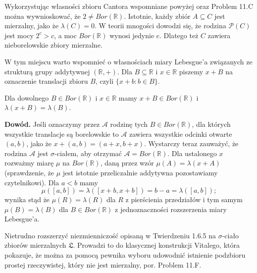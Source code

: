 Wykorzystując własności zbioru Cantora wspomniane powyżej oraz Problem 11.C można wywnioskować, że \(2 \neq Bor(\mathbb{R})\). Istotnie, każdy zbiór \(A \subseteq C\) jest mierzalny, jako że \(\lambda(C) = 0\). W teorii mnogości dowodzi się, że rodzina \(\mathcal{P}(C)\) jest mocy \(2^c > c\), a moc \(Bor(\mathbb{R})\) wynosi jedynie c. Dlatego też \(C\) zawiera nieborelowskie zbiory mierzalne.

W tym miejscu warto wspomnieć o własnościach miary Lebesgue’a związanych ze strukturą grupy addytywnej \((\mathbb{R}, +)\). Dla \(B \subseteq \mathbb{R} \) i \(x \in \mathbb{R}\) piszemy \(x + B\) na oznaczenie translacji zbioru \(B\), czyli \(\{x + b : b \in B\}\).

\begin{theorem}[1.6.5]
Dla dowolnego \(B \in Bor(\mathbb{R}) \) i \(x \in \mathbb{R}\) mamy \(x + B \in Bor(\mathbb{R}) \) i \(\lambda(x + B) = \lambda(B)\).
\end{theorem}

\textbf{Dowód.} Jeśli oznaczymy przez \(\mathcal{A}\) rodzinę tych \(B \in Bor(\mathbb{R})\), dla których wszystkie translacje są borelowskie to \(\mathcal{A}\) zawiera wszystkie odcinki otwarte \((a, b)\), jako że \(x + (a, b) = (a + x, b + x)\). Wystarczy teraz zauważyć, że rodzina \(\mathcal{A}\) jest \(\sigma\)-ciałem, aby otrzymać \(\mathcal{A} = Bor(\mathbb{R})\). Dla ustalonego \(x\) rozważmy miarę \(\mu\) na \(Bor(\mathbb{R})\), daną przez wzór \(\mu(A) = \lambda(x + A)\) (sprawdzenie, że \(\mu\) jest istotnie przeliczalnie addytywna pozostawiamy czytelnikowi). Dla \(a < b\) mamy
\[
\mu([a, b]) = \lambda([x + b, x + b]) = b - a = \lambda([a, b]);
\]
wynika stąd że \(\mu(R) = \lambda(R)\) dla \(R\) z pierścienia przedziałów i tym samym \(\mu(B) = \lambda(B)\) dla \(B \in Bor(\mathbb{R})\) z jednoznaczności rozszerzenia miary Lebesgue’a.

Nietrudno rozszerzyć niezmienniczość opisaną w Twierdzeniu 1.6.5 na \(\sigma\)-ciało zbiorów mierzalnych \(\mathfrak{L}\). Prowadzi to do klasycznej konstrukcji Vitalego, która pokazuje, że można za pomocą pewnika wyboru udowodnić istnienie podzbioru prostej rzeczywistej, który nie jest mierzalny, por. Problem 11.F.
